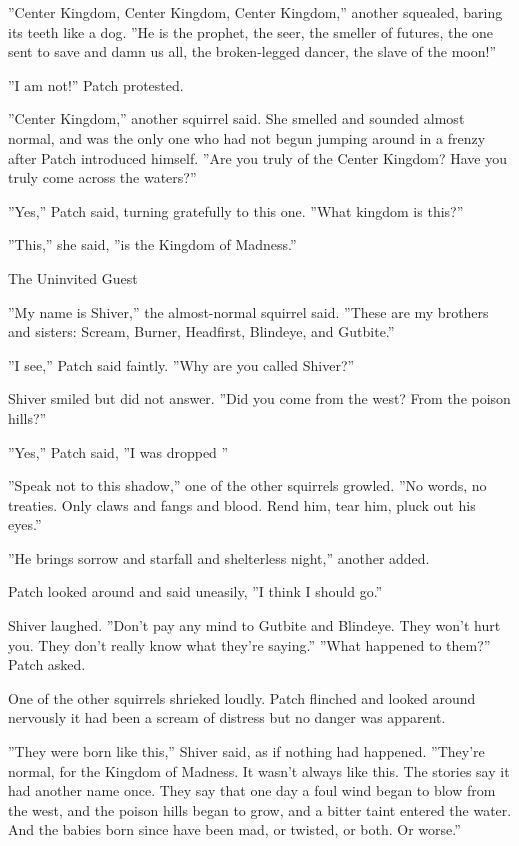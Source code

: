 \documentclass[11pt]{article}
\begin{document}
''Center Kingdom, Center Kingdom, Center Kingdom,'' another squealed, baring its teeth like a dog. ''He is the prophet, the seer, the smeller of futures, the one sent to save and damn us all, the broken-legged dancer, the slave of the moon!''\par
''I am not!'' Patch protested.\par
''Center Kingdom,'' another squirrel said. She smelled and sounded almost normal, and was the only one who had not begun jumping around in a frenzy after Patch introduced himself. ''Are you truly of the Center Kingdom? Have you truly come across the waters?''\par
''Yes,'' Patch said, turning gratefully to this one. ''What kingdom is this?''\par
''This,'' she said, ''is the Kingdom of Madness.''\par
{\bf \par
The Uninvited Guest\par
}\par
 ''My name is Shiver,'' the almost-normal squirrel said. ''These are my brothers and sisters: Scream, Burner, Headfirst, Blindeye, and Gutbite.''\par
 ''I see,'' Patch said faintly. ''Why are you called Shiver?''\par
 Shiver smiled but did not answer. ''Did you come from the west? From the poison hills?''\par
 ''Yes,'' Patch said, ''I was dropped %
''\par
 ''Speak not to this shadow,'' one of the other squirrels growled. ''No words, no treaties. Only claws and fangs and blood. Rend him, tear him, pluck out his eyes.''\par
 ''He brings sorrow and starfall and shelterless night,'' another added.\par
 Patch looked around and said uneasily, ''I think I should go.''\par
 Shiver laughed. ''Don't pay any mind to Gutbite and Blindeye. They won't hurt you. They don't really know what they're saying.'' ''What happened to them?'' Patch asked.\par
 One of the other squirrels shrieked loudly. Patch flinched and looked around nervously %
 it had been a scream of distress %
 but no danger was apparent.\par
 ''They were born like this,'' Shiver said, as if nothing had happened. ''They're normal, for the Kingdom of Madness. It wasn't always like this. The stories say it had another name once. They say that one day a foul wind began to blow from the west, and the poison hills began to grow, and a bitter taint entered the water. And the babies born since have been mad, or twisted, or both. Or worse.''\par
\end{document}
